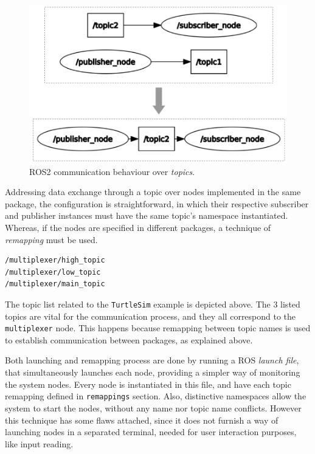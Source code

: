 \begin{figure}[H]
        \centering
        \includegraphics[width=0.4\linewidth]{images/ros2-topics.png}
        \caption{ROS2 communication behaviour over \textit{topics}.}
        \label{fig:ros2-topics}
\end{figure}

Addressing data exchange through a topic over nodes implemented in the same package, the configuration is straightforward, in which their respective subscriber and publisher instances must have the same topic's namespace instantiated. Whereas, if the nodes are specified in different packages, a technique of \textit{remapping} must be used.

\begin{lstlisting}[title={The \texttt{TurtleSim} topic list.}]
/multiplexer/high_topic
/multiplexer/low_topic
/multiplexer/main_topic
\end{lstlisting}

The topic list related to the \texttt{TurtleSim} example is depicted above. The 3 listed topics are vital for the communication process, and they all correspond to the \texttt{multiplexer} node. This happens because remapping between topic names is used to establish communication between packages, as explained above. 

Both launching and remapping process are done by running a ROS \textit{launch file}, that simultaneously launches each node, providing a simpler way of monitoring the system nodes. Every node is instantiated in this file, and have each topic remapping defined in \texttt{remappings} section. Also, distinctive namespaces allow the system to start the nodes, without any name nor topic name conflicts. However this technique has some flaws attached, since it does not furnish a way of launching nodes in a separated terminal, needed for user interaction purposes, like input reading.


